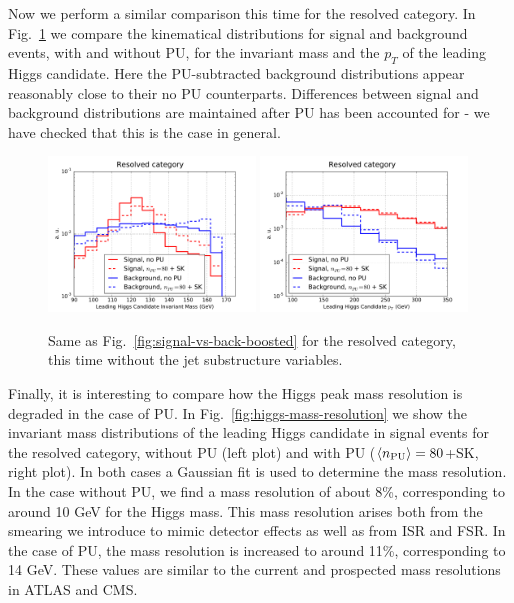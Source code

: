 Now we perform a similar comparison this time for
the resolved category.
%
In Fig.~\ref{fig:signal-vs-back-resolved} we compare
the kinematical distributions for signal and background events,
     with and without PU, for the invariant mass and the $p_T$ of the leading
     Higgs candidate.
     Here the PU-subtracted background distributions appear reasonably close
     to their no PU counterparts.
     Differences between signal and background distributions are maintained after PU
     has been accounted for - we have checked that this is the case
     in general.


\begin{figure}[t]
  \begin{center}
    \vspace{-1cm}
  \includegraphics[width=0.49\textwidth]{plots/m_h0_res_comp_back.pdf}
  \includegraphics[width=0.49\textwidth]{plots/pt_h0_res_comp_back.pdf}
     \caption{\small
       Same as Fig.~\ref{fig:signal-vs-back-boosted} for the resolved category,
       this time without the jet substructure variables.
}
\label{fig:signal-vs-back-resolved}
\end{center}
\end{figure}


Finally, it is interesting to compare how the Higgs peak mass resolution is degraded
in the case of PU.
%
In Fig.~\ref{fig:higgs-mass-resolution} we show the invariant mass distributions of the leading
    Higgs candidate in signal events for the resolved category, without
    PU (left plot) and with PU ($\left\langle n_{\rm PU}\right\rangle=80$+SK, right plot).
    In both cases a Gaussian fit is used to determine the mass resolution.
    In the case without PU, we find a mass resolution of about 8\%, corresponding
    to around 10 GeV for the Higgs mass.
    This mass resolution arises both from the smearing we introduce to mimic detector
    effects as well as from ISR and FSR.
    In the case of PU, the mass resolution is increased to around 11\%, corresponding to
    14 GeV.
    These values are similar to the current and prospected mass resolutions in ATLAS and CMS.
    
